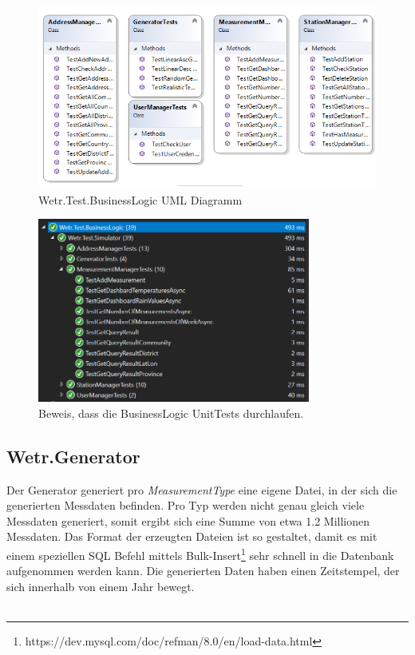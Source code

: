 \begin{figure}[H]
\centering
\includegraphics[width=\textwidth]{pictures/Wetr_Test_BusinessLogic.png}
\caption{Wetr.Test.BusinessLogic UML Diagramm}
\label{fig:Wetr.Test.Dal}
\end{figure}
\raggedright

\begin{figure}[H]
\centering
\includegraphics[width=0.8\textwidth]{pictures/bl_tests.png}
\caption{Beweis, dass die BusinessLogic UnitTests durchlaufen.}
\end{figure}
\raggedright

\newpage
\subsection{Wetr.Generator}
\label{sec:generator}

Der Generator generiert pro \textit{MeasurementType} eine eigene Datei, in der sich die generierten Messdaten befinden. Pro Typ werden nicht genau gleich viele Messdaten generiert, somit ergibt sich eine Summe von etwa 1.2 Millionen Messdaten. Das Format der erzeugten Dateien ist so gestaltet, damit es mit einem speziellen SQL Befehl mittels Bulk-Insert\footnote{https://dev.mysql.com/doc/refman/8.0/en/load-data.html} sehr schnell in die Datenbank aufgenommen werden kann. Die generierten Daten haben einen Zeitstempel, der sich innerhalb von einem Jahr bewegt.~\\~\\ %

